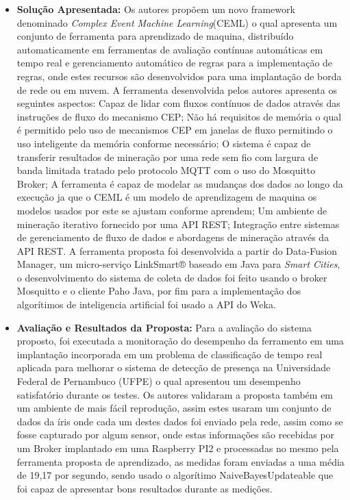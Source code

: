 \documentclass[tid,table]{texufpel} %
\begin{document}
\begin{itemize}
	\item \textbf{Solução Apresentada:} Os autores propõem um novo framework denominado \textit{Complex Event Machine Learning}(CEML) o qual apresenta um conjunto de ferramenta para aprendizado de maquina, distribuído automaticamente em ferramentas de avaliação contínuas automáticas em tempo real e gerenciamento automático de regras para a implementação de regras, onde estes recursos são desenvolvidos para uma implantação de borda de rede ou em nuvem. A ferramenta desenvolvida pelos autores apresenta os seguintes aspectos: Capaz de lidar com fluxos contínuos de dados através das instruções de fluxo do mecanismo CEP; Não há requisitos de memória o qual é permitido pelo uso de mecanismos CEP em janelas de fluxo permitindo o uso inteligente da memória conforme necessário; O sistema é capaz de transferir resultados de mineração por uma rede sem fio com largura de banda limitada tratado pelo protocolo MQTT com o uso do Mosquitto Broker; A ferramenta é capaz de modelar as mudanças dos dados ao longo da execução ja que o CEML é um modelo de aprendizagem de maquina os modelos usados por este se ajustam conforme aprendem; Um ambiente de mineração iterativo fornecido por uma API REST; Integração entre sistemas de gerenciamento de fluxo de dados e abordagens de mineração através da API REST. A ferramenta proposta foi desenvolvida a partir do Data-Fusion Manager, um micro-serviço LinkSmart® baseado em Java para \textit{Smart Cities}, o desenvolvimento do sistema de coleta de dados foi feito usando o broker Mosquitto e o cliente Paho Java, por fim para a implementação dos algorítimos de inteligencia artificial foi usado a API do Weka. 
	
	\item \textbf{Avaliação e Resultados da Proposta:} Para a avaliação do sistema proposto, foi executada a monitoração do desempenho da ferramento em uma implantação incorporada em um problema de classificação de tempo real aplicada para melhorar o sistema de detecção de presença na Universidade Federal de Pernambuco (UFPE) o qual apresentou um desempenho satisfatório durante os testes. Os autores validaram a proposta também em um ambiente de mais fácil reprodução, assim estes usaram um conjunto de dados da íris onde cada um destes dados foi enviado pela rede, assim como se fosse capturado por algum sensor,  onde estas informações são recebidas por um Broker implantado em uma Raspberry PI2 e processadas no mesmo pela ferramenta proposta de aprendizado, as medidas foram enviadas a uma média de 19,17 por segundo, sendo usado o algorítimo NaiveBayesUpdateable que foi capaz de apresentar bons resultados durante as medições.
	
	
	
\end{itemize}
\end{document}
